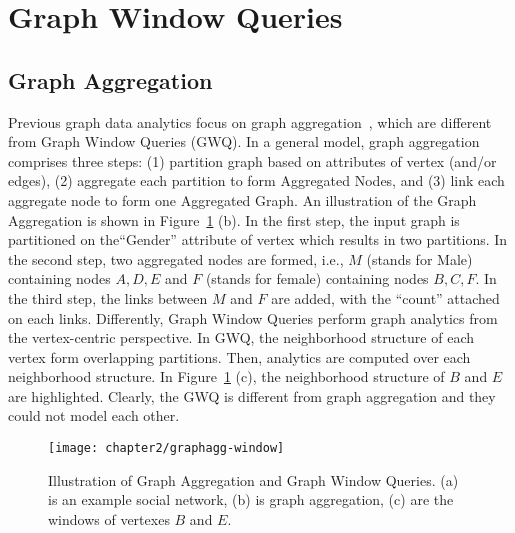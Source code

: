\section{Graph Window Queries}

\subsection{Graph Aggregation}
Previous graph data analytics focus on graph aggregation~\cite{zhao2011graph,wang2014pagrol,chen2008graph,tian2008efficient},
which are different from Graph Window Queries (GWQ).
In a general model, graph aggregation comprises three steps: (1) partition
graph based on attributes of vertex (and/or edges), (2) aggregate each
partition to form Aggregated Nodes, and (3) link each aggregate node to
form one Aggregated Graph. An illustration of the Graph Aggregation is shown 
in Figure~\ref{fig:rw-agg-window} (b). In the first step, the input graph
is partitioned on the``Gender'' attribute of vertex which results in two partitions. In the second
step, two aggregated nodes are formed, i.e., $M$ (stands for Male) containing nodes $A,D,E$
and $F$ (stands for female) containing nodes $B,C,F$. In the third step, the links between 
$M$ and $F$ are added, with the ``count'' attached on each links. 
Differently, Graph Window Queries perform graph analytics from the vertex-centric perspective.
In GWQ, the neighborhood structure of each vertex form overlapping partitions. Then,
analytics are computed over each neighborhood structure. In
Figure~\ref{fig:rw-agg-window} (c), the neighborhood structure of $B$ and $E$
are highlighted. Clearly, the GWQ is different from graph aggregation
and they could not model each other.
%

\begin{figure}[h]
\centering
\texttt{[image: chapter2/graphagg-window]}
\caption{Illustration of Graph Aggregation and Graph Window Queries. (a) is an example social network, (b) is graph aggregation, (c) are the windows of vertexes $B$ and $E$.}
\label{fig:rw-agg-window}
\end{figure}



